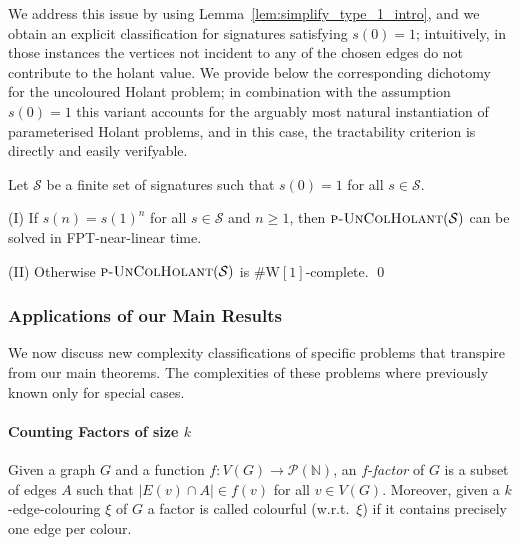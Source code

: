 \documentclass[authorcolumns,numberwithinsect]{no-lipics-v2022}
\newcommand{\W}{\mathrm{W}}
\begin{document}
We address this issue by using Lemma~\ref{lem:simplify_type_1_intro}, and we obtain an explicit classification for signatures satisfying $s(0)=1$; intuitively, in those instances the vertices not incident to any of the chosen edges do not contribute to the holant value. We provide below the corresponding dichotomy for the uncoloured Holant problem; in combination with the assumption $s(0)=1$ this variant accounts for the arguably most natural instantiation of parameterised Holant problems, and in this case, the tractability criterion is directly and easily verifyable.
\begin{mtheorem}
    Let $\mathcal{S}$ be a finite set of signatures such that $s(0)=1$ for all $s\in \mathcal{S}$. 
    \item[(I)] If  $s(n)=s(1)^n$ for all $s\in \mathcal{S}$ and $n\geq 1$, then $\text{\sc{p-UnColHolant}}(\mathcal{S})$ can be solved in FPT-near-linear time.
        \item[(II)] Otherwise $\text{\sc{p-UnColHolant}}(\mathcal{S})$ is $\#\W[1]$-complete. \qed
\end{mtheorem}





\subsubsection{Applications of our Main Results}

We now discuss new complexity classifications of specific problems that transpire from our main theorems. The complexities of these problems where previously known only for special cases.

\paragraph*{Counting Factors of size $k$}
Given a graph $G$ and a function $f:V(G)\to \mathcal{P}(\mathbb{N})$, an $f$-\emph{factor} of $G$ is a subset of edges $A$ such that $|E(v)\cap A| \in f(v)$ for all $v\in V(G)$. Moreover, given a $k$-edge-colouring $\xi$ of $G$ a factor is called colourful (w.r.t.\ $\xi$) if it contains precisely one edge per colour.
\end{document}
